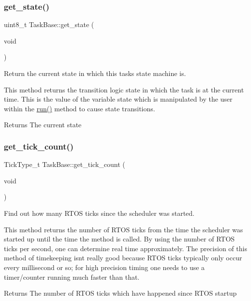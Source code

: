 \subsubsection{\texorpdfstring{get\+\_\+state()}{get\_state()}}
{\footnotesize\ttfamily uint8\+\_\+t Task\+Base\+::get\+\_\+state (\begin{DoxyParamCaption}\item[{void}]{ }\end{DoxyParamCaption})\hspace{0.3cm}{\ttfamily [inline]}}



Return the current state in which this task\textquotesingle{}s state machine is. 

This method returns the transition logic state in which the task is at the current time. This is the value of the variable {\ttfamily state} which is manipulated by the user within the {\ttfamily \mbox{\hyperlink{class_task_base_adcf6036ad9c860051ccf392ba5e7dbbc}{run()}}} method to cause state transitions. \begin{DoxyReturn}{Returns}
The current state 
\end{DoxyReturn}
\mbox{\label{class_task_base_aea05d3d35f6cbda823ed4812b0951944}} 
\subsubsection{\texorpdfstring{get\+\_\+tick\+\_\+count()}{get\_tick\_count()}}
{\footnotesize\ttfamily Tick\+Type\+\_\+t Task\+Base\+::get\+\_\+tick\+\_\+count (\begin{DoxyParamCaption}\item[{void}]{ }\end{DoxyParamCaption})\hspace{0.3cm}{\ttfamily [inline]}}



Find out how many R\+T\+OS ticks since the scheduler was started. 

This method returns the number of R\+T\+OS ticks from the time the scheduler was started up until the time the method is called. By using the number of R\+T\+OS ticks per second, one can determine real time approximately. The precision of this method of timekeeping isn\textquotesingle{}t really good because R\+T\+OS ticks typically only occur every millisecond or so; for high precision timing one needs to use a timer/counter running much faster than that. \begin{DoxyReturn}{Returns}
The number of R\+T\+OS ticks which have happened since R\+T\+OS startup 
\end{DoxyReturn}
\mbox{\label{class_task_base_a4d0769068c3095d76752e0a00963d8b8}} 
